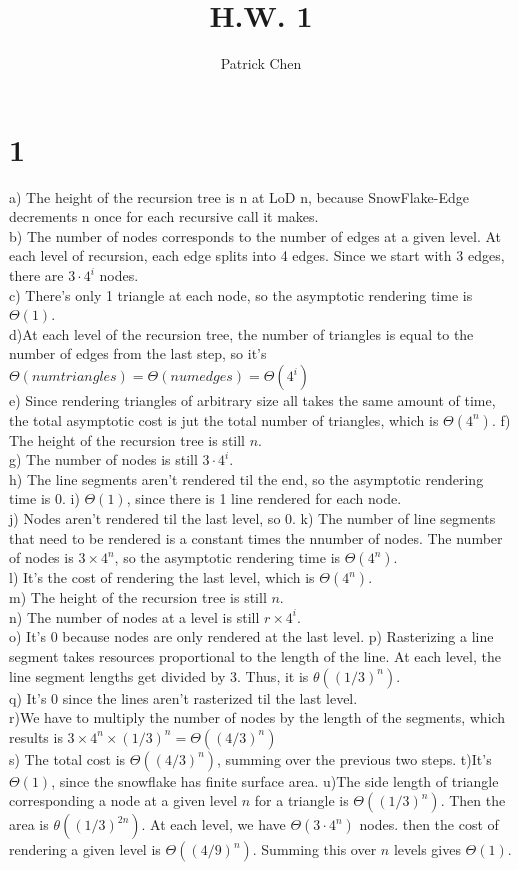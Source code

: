 \documentclass[10pt,a4paper]{article}
\title{H.W. 1}
\author{Patrick Chen}
\begin{document}
\maketitle
\tableofcontents
\section{1}
a) 
The height of the recursion tree is n at LoD n, because SnowFlake-Edge decrements n once for each recursive call it makes. \\
b) The number of nodes corresponds to the number of edges at a given level. At each level of recursion, each edge splits into 4 edges. Since we start with 3 edges, there are $3 \cdot 4^i$ nodes.\\
c) There's only 1 triangle at each node, so the asymptotic rendering time is $\Theta(1)$.\\
d)At each level of the recursion tree, the number of triangles is equal to the number of edges from the last step, so it's 
$\Theta(num triangles)=\Theta(num edges)=\Theta(4^i)$\\
e) Since rendering triangles of arbitrary size all takes the same amount of time, the total asymptotic cost is jut the total number of triangles, which is $\Theta(4^n)$.
f) The height of the recursion tree is still $n$.\\
g) The number of nodes is still $3 \cdot 4^i$.\\
h) The line segments aren't rendered til the end, so the asymptotic rendering time is $0$.
i) $\Theta(1)$, since there is 1 line rendered for each node. \\
j) Nodes aren't rendered til the last level, so $0$.
k) The number of line segments that need to be rendered is a constant times the nnumber of nodes. The number of nodes is $3 \times 4^n$, so the asymptotic rendering time is $\Theta(4^n)$. \\
l) It's the cost of rendering the last level, which is $\Theta(4^n)$.\\
m) The height of the recursion tree is still $n$.\\
n) The number of nodes at a level is still $r \times 4^i$. \\
o) It's $0$ because nodes are only rendered at the last level.
p) Rasterizing a line segment takes resources proportional to the length of the line. At each level, the line segment lengths get divided by 3. Thus, it is $\theta((1/3)^n)$.\\
q)  It's $0$ since the lines aren't rasterized til the last level.\\
r)We have to multiply the number of nodes by the length of the segments, which results is $3 \times 4^n \times (1/3)^n= \Theta((4/3)^n)$ \\
s) The total cost is $\Theta((4/3)^n)$, summing over the previous two steps.
t)It's $\Theta(1)$, since the snowflake has finite surface area.
u)The side length of triangle corresponding a node at a given level $n$ for a triangle is $\Theta((1/3)^n)$. Then the area is $\theta((1/3)^{2n})$. At each level, we have $\Theta(3 \cdot 4^n)$ nodes. then the cost of rendering a given level is $\Theta((4/9)^n)$. Summing this over $n$ levels gives $\Theta(1)$.
\end{document}

